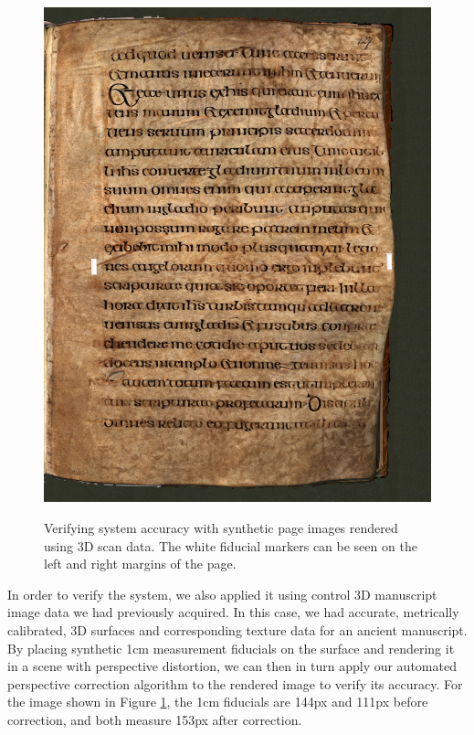 \documentclass[a4paper]{llncs}
\begin{document}
\begin{figure}[h!tbm]
{    \includegraphics[height=.35\textheight]{figures-downsampled/snapshot-fiducial-withbg-unwarped-ar.jpg}
    \label{fig:synthetic-after}
  }
  
  \caption{Verifying system accuracy with synthetic page images rendered using 3D scan data. The white fiducial markers can be seen on the left and right margins of the page.}\label{fig:synthetic}
\end{figure}

In order to verify the system, we also applied it using control 3D manuscript image data we had previously acquired.
In this case, we had accurate, metrically calibrated, 3D surfaces and corresponding texture data for an ancient manuscript. By placing synthetic 1cm measurement fiducials on the surface and rendering it in a scene with perspective distortion,
we can then in turn apply our automated perspective correction algorithm to the rendered image to verify its accuracy. For the image shown in Figure \ref{fig:synthetic}, the 1cm fiducials are 144px and 111px before correction, and both measure 153px after correction.
\end{document}

